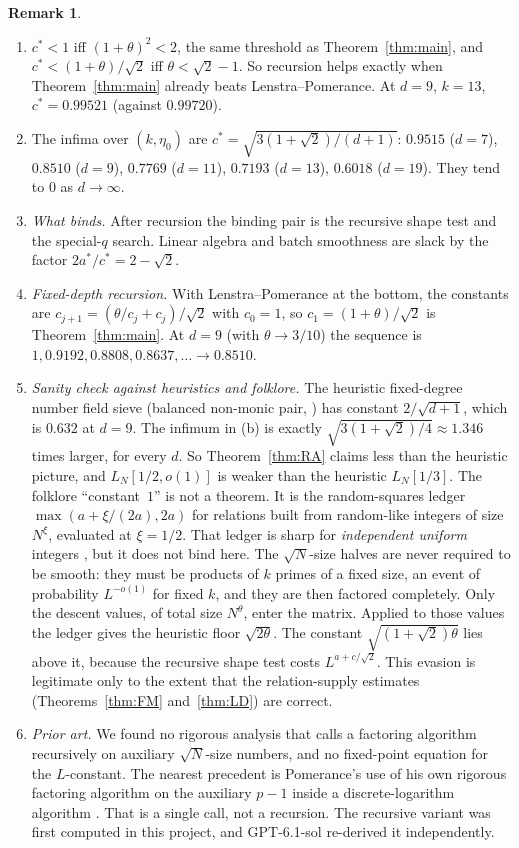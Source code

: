 \documentclass[11pt]{amsart}
\theoremstyle{definition}
\newtheorem{remark}[theorem]{Remark}
\begin{document}
\begin{remark}\label{rem:RA}
\begin{enumerate}[label=(\alph*)]
\item $c^*<1$ iff $(1+\theta)^2<2$, the same threshold as Theorem~\ref{thm:main}, and $c^*<(1+\theta)/\sqrt2$ iff $\theta<\sqrt2-1$. So
  recursion helps exactly when Theorem~\ref{thm:main} already beats Lenstra--Pomerance. At $d=9$, $k=13$, $c^*=0.99521$
  (against $0.99720$).
\item The infima over $(k,\eta_0)$ are $c^*=\sqrt{3(1+\sqrt2)/(d+1)}$: $0.9515$ ($d=7$), $0.8510$ ($d=9$), $0.7769$ ($d=11$), $0.7193$ ($d=13$),
  $0.6018$ ($d=19$). They tend to $0$ as $d\to\infty$.
\item \emph{What binds.} After recursion the binding pair is the recursive shape test and the special-$q$ search. Linear algebra and
  batch smoothness are slack by the factor $2a^*/c^*=2-\sqrt2$.
\item \emph{Fixed-depth recursion.} With Lenstra--Pomerance at the bottom, the constants are $c_{j+1}=(\theta/c_j+c_j)/\sqrt2$ with $c_0=1$, so
  $c_1=(1+\theta)/\sqrt2$ is Theorem~\ref{thm:main}. At $d=9$ (with $\theta\to3/10$) the sequence is $1,0.9192,0.8808,0.8637,\dots\to0.8510$.
\item \emph{Sanity check against heuristics and folklore.} The heuristic fixed-degree number field sieve (balanced non-monic pair,
  \cite[\S12]{blp1993}) has constant $2/\sqrt{d+1}$, which is $0.632$ at $d=9$. The infimum in (b) is exactly $\sqrt{3(1+\sqrt2)/4}\approx1.346$ times
  larger, for every $d$. So Theorem~\ref{thm:RA} claims less than the heuristic picture, and $L_N[1/2,o(1)]$ is weaker than the heuristic
  $L_N[1/3]$. The folklore ``constant~$1$'' is not a theorem. It is the random-squares ledger $\max(a+\xi/(2a),2a)$ for relations built from
  random-like integers of size $N^\xi$, evaluated at $\xi=1/2$. That ledger is sharp for \emph{independent uniform} integers
  \cite{cgpt2012,bbm2018}, but it does not bind here. The $\sqrt N$-size halves are never required to be smooth: they must be products of
  $k$ primes of a fixed size, an event of probability $L^{-o(1)}$ for fixed $k$, and they are then factored completely. Only the descent
  values, of total size $N^\theta$, enter the matrix. Applied to those values the ledger gives the heuristic floor $\sqrt{2\theta}$. The
  constant $\sqrt{(1+\sqrt2)\theta}$ lies above it, because the recursive shape test costs $L^{a+c/\sqrt2}$. This evasion is legitimate only to
  the extent that the relation-supply estimates (Theorems~\ref{thm:FM} and~\ref{thm:LD}) are correct.
\item \emph{Prior art.} We found no rigorous analysis that calls a factoring algorithm recursively on auxiliary $\sqrt N$-size
  numbers, and no fixed-point equation for the $L$-constant. The nearest precedent is Pomerance's use of his own rigorous factoring algorithm
  on the auxiliary $p-1$ inside a discrete-logarithm algorithm \cite[pp.~138--139]{pomerance1987}. That is a single call, not a recursion. The
  recursive variant was first computed in this project, and GPT-6.1-sol re-derived it independently.
\end{enumerate}
\end{remark}
\end{document}
